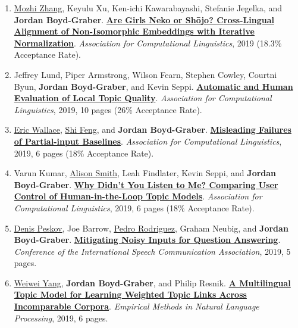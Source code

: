 {\begin{enumerate}
	 \item \underline{\href{http://www.mozhi.umiacs.io}{Mozhi Zhang}}, Keyulu Xu, Ken-ichi Kawarabayashi, Stefanie Jegelka, and {\bf Jordan Boyd-Graber}.  {\bf \href{http://cs.umd.edu/~jbg//docs/2019_acl_clwe.pdf}{Are Girls Neko or Sh{\=o}jo? {C}ross-Lingual Alignment of Non-Isomorphic Embeddings with Iterative Normalization}}.  \emph{Association for Computational Linguistics}, 2019 (18.3\% Acceptance Rate).

	 \item Jeffrey Lund, Piper Armstrong, Wilson Fearn, Stephen Cowley, Courtni Byun, {\bf Jordan Boyd-Graber}, and Kevin Seppi.  {\bf \href{http://cs.umd.edu/~jbg//docs/2019_acl_local.pdf}{Automatic and Human Evaluation of Local Topic Quality}}.  \emph{Association for Computational Linguistics}, 2019, 10 pages (26\% Acceptance Rate).

	 \item \underline{\href{http://www.ericswallace.com/}{Eric Wallace}}, \underline{\href{https://ihsgnef.github.io/}{Shi Feng}}, and {\bf Jordan Boyd-Graber}.  {\bf \href{http://cs.umd.edu/~jbg//docs/2019_acl_flipside.pdf}{Misleading Failures of Partial-input Baselines}}.  \emph{Association for Computational Linguistics}, 2019, 6 pages (18\% Acceptance Rate).

	 \item Varun Kumar, \underline{\href{http://alisonmsmith.github.io/}{Alison Smith}}, Leah Findlater, Kevin Seppi, and {\bf Jordan Boyd-Graber}.  {\bf \href{http://cs.umd.edu/~jbg//docs/2019_acl_control.pdf}{Why Didn't You Listen to Me? Comparing User Control of Human-in-the-Loop Topic Models}}.  \emph{Association for Computational Linguistics}, 2019, 6 pages (18\% Acceptance Rate).

	 \item \underline{\href{https://denis.ai/}{Denis Peskov}}, Joe Barrow, \underline{\href{https://www.pedro.ai/}{Pedro Rodriguez}}, Graham Neubig, and {\bf Jordan Boyd-Graber}.  {\bf \href{http://cs.umd.edu/~jbg//docs/2019_interspeech_asr}{Mitigating Noisy Inputs for Question Answering}}.  \emph{Conference of the International Speech Communication Association}, 2019, 5 pages.

	 \item \underline{\href{https://ywwbill.github.io/}{Weiwei Yang}}, {\bf Jordan Boyd-Graber}, and Philip Resnik.  {\bf \href{http://cs.umd.edu/~jbg//docs/2019_emnlp_mtm.pdf}{A Multilingual Topic Model for Learning Weighted Topic Links Across Incomparable Corpora}}.  \emph{Empirical Methods in Natural Language Processing}, 2019, 6 pages.


\end{enumerate}}
